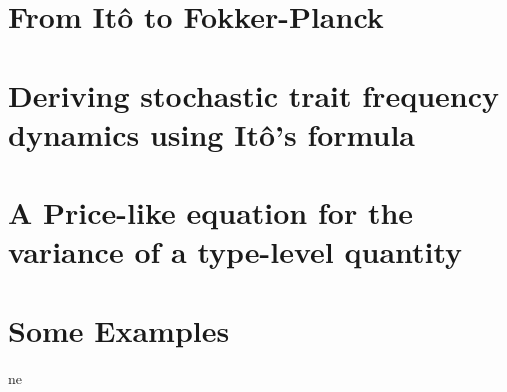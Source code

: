 \documentclass[twoside,12pt]{iiser-thesis-modified} %
\begin{document}
\fancyhead[CO]{  \rule[-4ex]{0pt}{4ex}\footnotesize\itshape{\chaptername~\thechapter: \nouppercase{\leftmark}}}


\chapter{From It\^{o} to Fokker-Planck}\label{App_SDE_FPE}

\chapter{Deriving stochastic trait frequency dynamics using It\^{o}'s formula}\label{App_density_to_freq}

\chapter{A Price-like equation for the variance of a type-level quantity}\label{App_stoch_var_eqns}

\chapter{Some Examples}\label{App_examples}
ne

\cleardoublepage
{}
\Huge\printbibheading
\renewcommand*{\bibfont}{\footnotesize}	
\printbibliography[heading=none]

\end{document}
